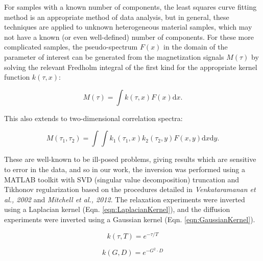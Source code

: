 \documentclass[PaulGanssle-Thesis.tex]{subfiles}
\begin{document}
For samples with a known number of components, the least squares curve fitting method is an appropriate method of data analysis, but in general, these techniques are applied to unknown heterogeneous material samples, which may not have a known (or even well-defined) number of components. For these more complicated samples, the pseudo-spectrum $F(x)$ in the domain of the parameter of interest can be generated from the magnetization signals $M(\tau)$ by solving the relevant Fredholm integral of the first kind for the appropriate kernel function $k(\tau, x)$:\cite{Song2002,Venkataramanan2002}

\begin{equation}
M(\tau) = \int k(\tau, x) F(x) \mathrm{d}x.
\label{eqn:FredholmIntegral1D}
\end{equation}   

This also extends to two-dimensional correlation spectra:

\begin{equation}
M(\tau_1, \tau_2) = \int \int k_1(\tau_1,x)k_2(\tau_2,y)F(x,y)\mathrm{d}x\mathrm{d}y.
\label{eqn:FredholmIntegral2D}
\end{equation}

These are well-known to be ill-posed problems\cite{Butler1981}, giving results which are sensitive to error in the data, and so in our work, the inversion was performed using a MATLAB toolkit with SVD (singular value decomposition) truncation and Tikhonov regularization based on the procedures detailed in \emph{Venkataramanan et al., 2002}\cite{Venkataramanan2002} and \emph{Mitchell et al., 2012}\cite{Mitchell2012}. The relaxation experiments were inverted using a Laplacian kernel (Eqn. \ref{eqn:LaplacianKernel}), and the diffusion experiments were inverted using a Gaussian kernel (Eqn. \ref{eqn:GaussianKernel}).

\begin{equation}
k(\tau, T) = e^{-\tau/T}
\label{eqn:LaplacianKernel}
\end{equation}

\begin{equation}
k(G, D) = e^{-G^2\cdot{}D}
\label{eqn:GaussianKernel}
\end{equation}
\end{document}
